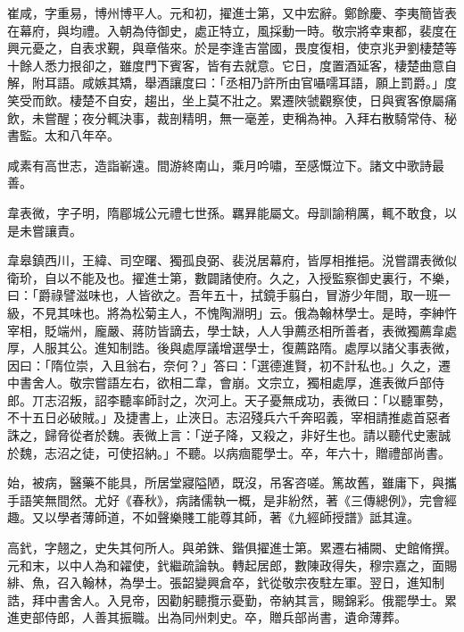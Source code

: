 \begin{pinyinscope}
 崔咸，字重易，博州博平人。元和初，擢進士第，又中宏辭。鄭餘慶、李夷簡皆表在幕府，與均禮。入朝為侍御史，處正特立，風採動一時。敬宗將幸東都，裴度在興元憂之，自表求覲，與章偕來。於是李逢吉當國，畏度復相，使京兆尹劉棲楚等十餘人悉力拫卻之，雖度門下賓客，皆有去就意。它日，度置酒延客，棲楚曲意自解，附耳語。咸嫉其矯，舉酒讓度曰：「丞相乃許所由官囁嚅耳語，願上罰爵。」度笑受而飲。棲楚不自安，趨出，坐上莫不壯之。累遷陜虢觀察使，日與賓客僚屬痛飲，未嘗醒；夜分輒決事，裁剖精明，無一毫差，吏稱為神。入拜右散騎常侍、秘書監。太和八年卒。



 咸素有高世志，造詣嶄遠。間游終南山，乘月吟嘯，至感慨泣下。諸文中歌詩最善。



 韋表微，字子明，隋郿城公元禮七世孫。羈昪能屬文。母訓諭稍厲，輒不敢食，以是未嘗讓責。



 韋皋鎮西川，王緯、司空曙、獨孤良弼、裴涚居幕府，皆厚相推挹。涚嘗謂表微似衛玠，自以不能及也。擢進士第，數闢諸使府。久之，入授監察御史裏行，不樂，曰：「爵祿譬滋味也，人皆欲之。吾年五十，拭鏡手翦白，冒游少年間，取一班一級，不見其味也。將為松菊主人，不愧陶淵明」云。俄為翰林學士。是時，李紳忤宰相，貶端州，龐嚴、蔣防皆謫去，學士缺，人人爭薦丞相所善者，表微獨薦韋處厚，人服其公。進知制誥。後與處厚議增選學士，復薦路隋。處厚以諸父事表微，因曰：「隋位崇，入且翁右，奈何？」答曰：「選德進賢，初不計私也。」久之，遷中書舍人。敬宗嘗語左右，欲相二韋，會崩。文宗立，獨相處厚，進表微戶部侍郎。丌志沼叛，詔李聽率師討之，次河上。天子憂無成功，表微曰：「以聽軍勢，不十五日必破賊。」及捷書上，止浹日。志沼殘兵六千奔昭義，宰相請推處首惡者誅之，歸脅從者於魏。表微上言：「逆子降，又殺之，非好生也。請以聽代史憲誠於魏，志沼之徒，可使招納。」不聽。以病痼罷學士。卒，年六十，贈禮部尚書。



 始，被病，醫藥不能具，所居堂寢隘陋，既沒，吊客咨嗟。篤故舊，雖庸下，與攜手語笑無間然。尤好《春秋》，病諸儒執一概，是非紛然，著《三傳總例》，完會經趣。又以學者薄師道，不如聲樂賤工能尊其師，著《九經師授譜》詆其違。



 高釴，字翹之，史失其何所人。與弟銖、鍇俱擢進士第。累遷右補闕、史館脩撰。元和末，以中人為和糴使，釴繼疏論執。轉起居郎，數陳政得失，穆宗嘉之，面賜緋、魚，召入翰林，為學士。張韶變興倉卒，釴從敬宗夜駐左軍。翌日，進知制誥，拜中書舍人。入見帝，因勸躬聽攬示憂勤，帝納其言，賜錦彩。俄罷學士。累進吏部侍郎，人善其振職。出為同州刺史。卒，贈兵部尚書，遺命薄葬。




\end{pinyinscope}
